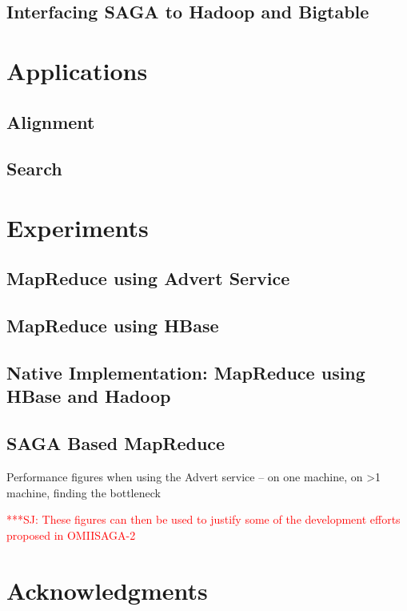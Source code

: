 \documentclass{rspublic}
\newcommand{\jhanote}[1]{ {\textcolor{red} { ***SJ: #1 }}}
\newcommand{\jhanote}[1]{}
\begin{document}

\subsection*{Interfacing SAGA to Hadoop and Bigtable}

\section{Applications}

\subsection*{Alignment}

\subsection*{Search}

\section*{Experiments}

\subsection*{MapReduce using Advert Service}

\subsection*{MapReduce using HBase}

\subsection*{Native Implementation: MapReduce using HBase and Hadoop}

\subsection*{SAGA Based MapReduce}

Performance figures when using the Advert service -- on one machine,
on >1 machine, finding the bottleneck

\jhanote{These figures can then be used to justify some of the 
  development efforts proposed in OMIISAGA-2}

\section{Acknowledgments}



\end{document}
